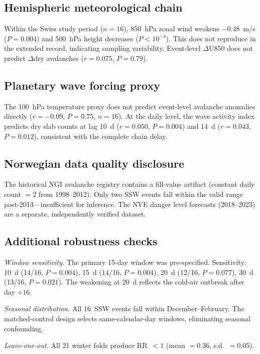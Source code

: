 \documentclass[11pt,letterpaper]{article}
\begin{document}
\subsection{Hemispheric meteorological chain}

Within the Swiss study period ($n = 16$), 850~hPa zonal wind weakens $-0.48$~m/s ($P = 0.004$) and 500~hPa height decreases ($P < 10^{-4}$). This does not reproduce in the extended record, indicating sampling variability. Event-level $\Delta$U850 does not predict $\Delta$dry avalanches ($r = 0.075$, $P = 0.79$).

\subsection{Planetary wave forcing proxy}

The 100~hPa temperature proxy does not predict event-level avalanche anomalies directly ($r = -0.09$, $P = 0.75$, $n = 16$). At the daily level, the wave activity index predicts dry slab counts at lag 10~d ($r = 0.050$, $P = 0.004$) and 14~d ($r = 0.043$, $P = 0.012$), consistent with the complete chain delay.

\subsection{Norwegian data quality disclosure}

The historical NGI avalanche registry contains a fill-value artifact (constant daily count $= 2$ from 1998--2012). Only two SSW events fall within the valid range post-2013---insufficient for inference. The NVE danger level forecasts (2018--2023) are a separate, independently verified dataset.

\subsection{Additional robustness checks}

\textit{Window sensitivity.} The primary 15-day window was pre-specified. Sensitivity: 10~d (14/16, $P = 0.004$), 15~d (14/16, $P = 0.004$), 20~d (12/16, $P = 0.077$), 30~d (13/16, $P = 0.021$). The weakening at 20~d reflects the cold-air outbreak after day $+16$.

\textit{Seasonal distribution.} All 16~SSW events fall within December--February. The matched-control design selects same-calendar-day windows, eliminating seasonal confounding.

\textit{Leave-one-out.} All 21 winter folds produce RR~$< 1$ (mean $= 0.36$, s.d.~$= 0.05$).
\end{document}
